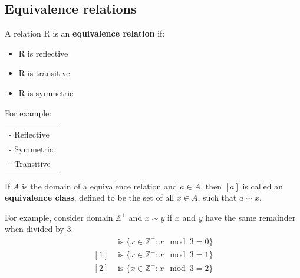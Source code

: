 \subsection{Equivalence relations}
A relation R is an \textbf{equivalence relation} if:
\begin{itemize}
  \item R is reflective
  \item R is transitive
  \item R is symmetric
\end{itemize}
For example:
\begin{center}
  \qquad
  \qquad
  \begin{tabular}{l}
    - Reflective \\
    - Symmetric  \\
    - Transitive
  \end{tabular}
\end{center}
If $A$ is the domain of a equivalence relation and $a \in A$, then $[a]$ is called an \textbf{equivalence class},
defined to be the set of all $x \in A$, such that $a \sim x$.

For example, consider domain $\mathbb{Z}^+$ and $x \sim y$ if $x$ and $y$ have the same remainder when divided by 3.
\begin{align*}
  [0] & \text{ is } \{x \in \mathbb{Z}^+: x \mod 3 = 0\} \\
  [1] & \text{ is } \{x \in \mathbb{Z}^+: x \mod 3 = 1\} \\
  [2] & \text{ is } \{x \in \mathbb{Z}^+: x \mod 3 = 2\} \\
\end{align*}

